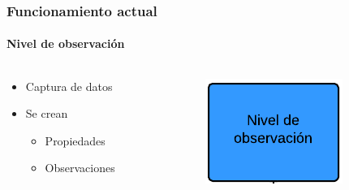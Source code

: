 \begin{frame}
	\frametitle{Funcionamiento actual}
	\framesubtitle{Nivel de observaci\'on}
	
	\begin{columns}[T] %
		\begin{column}[T]{5cm} %
			\begin{itemize}
				\item Captura de datos
				\item Se crean
				\begin{itemize}
					\item Propiedades
					\item Observaciones
				\end{itemize}
			\end{itemize}
		\end{column}
		\begin{column}[T]{5cm} %
			\includegraphics[width=0.5\linewidth]{./Figures/NivelDeObservacion.png}
		\end{column}
	\end{columns}
\end{frame}


